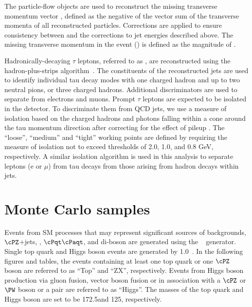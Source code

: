 The particle-flow objects are used to reconstruct the missing transverse momentum  vector \ptvecmiss, defined as the negative of the vector sum of the transverse momenta of all reconstructed particles.  Corrections are applied to ensure consistency between
\ptvecmiss and the corrections to jet energies described above.  The missing transverse momentum in the event (\MPT) is defined as the magnitude of \ptvecmiss.

Hadronically-decaying $\tau$ leptons, referred to as \Tau, are reconstructed using the hadron-plus-strips algorithm~\cite{Khachatryan:2015dfa}.
The constituents of the reconstructed jets are used to identify individual tau decay modes with one charged 
hadron and up to two neutral pions, or three charged hadrons. 
Additional discriminators are used to separate \Tau from electrons and muons.
Prompt $\tau$ leptons are expected to be isolated in the detector.
To discriminate them from QCD jets, we use a measure of isolation 
based on the charged hadrons and photons falling within 
a cone around the tau momentum direction after correcting for the effect of
pileup \cite{Khachatryan:2014wca}. The ``loose'', ``medium'' and ``tight'' working points are defined
by requiring the measure of isolation not to exceed thresholds of 2.0, 1.0,
and 0.8 GeV, respectively.
 A similar isolation algorithm is 
used in this analysis to separate leptons (e or $\mu$) from tau decays from 
those arising from hadron decays within jets.

\section{Monte Carlo samples}
\label{sect:MCSamples}
Events from SM processes that may represent significant sources of backgrounds, $\cPZ$+jets, \wjets, $\cPqt\cPaqt$, and di-boson 
are generated using the ~\cite{Alwall:2011uj} generator. 
Single top quark and Higgs boson events are generated by {\POWHEG} 1.0~\cite{Nason:2004rx,Frixione:2007vw,Alioli:2009je,Alioli:2010xd}.
In the following figures and tables, the events containing at least one top quark or one $\cPZ$ boson are referred to as ``Top'' and ``ZX'', respectively. 
Events from Higgs boson production via gluon fusion, vector boson fusion or in association with a $\cPZ$ or $\PW$ boson or a \ttbar pair are referred to as ``Higgs''. The masses of the top quark and Higgs boson are set to be 172.5\GeV and 125\GeV, respectively.


